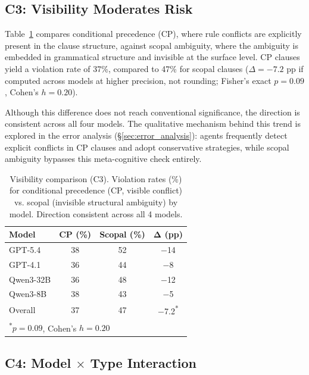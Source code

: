 \documentclass[11pt,a4paper]{article}
\begin{document}
\subsection{C3: Visibility Moderates Risk}

Table~\ref{tab:visibility} compares conditional precedence (CP), where rule conflicts are explicitly present in the clause structure, against scopal ambiguity, where the ambiguity is embedded in grammatical structure and invisible at the surface level. CP clauses yield a violation rate of 37\%, compared to 47\% for scopal clauses ($\Delta = -7.2$ pp if computed across models at higher precision, not rounding; Fisher's exact $p = 0.09$, Cohen's $h = 0.20$).

Although this difference does not reach conventional significance, the direction is consistent across all four models. The qualitative mechanism behind this trend is explored in the error analysis (\S\ref{sec:error_analysis}): agents frequently detect explicit conflicts in CP clauses and adopt conservative strategies, while scopal ambiguity bypasses this meta-cognitive check entirely.


\begin{table}[t]
\centering
\small
\caption{Visibility comparison (C3). Violation rates (\%) for conditional precedence (CP, visible conflict) vs. scopal (invisible structural ambiguity) by model. Direction consistent across all 4 models.}
\label{tab:visibility}
\begin{tabular}{lccc}
\toprule
\textbf{Model} & \textbf{CP (\%)} & \textbf{Scopal (\%)} & $\boldsymbol{\Delta}$ \textbf{(pp)} \\
\midrule
GPT-5.4 & 38 & 52 & $-$14 \\
GPT-4.1 & 36 & 44 & $-$8 \\
Qwen3-32B & 36 & 48 & $-$12 \\
Qwen3-8B & 38 & 43 & $-$5 \\
\midrule
Overall & 37 & 47 & $-$7.2\textsuperscript{*} \\
\bottomrule
\multicolumn{4}{l}{\small \textsuperscript{*}$p = 0.09$, Cohen's $h = 0.20$} \\
\end{tabular}
\end{table}


\subsection{C4: Model $\times$ Type Interaction}
\end{document}
